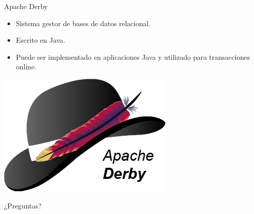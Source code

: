 \documentclass{beamer}
\begin{document}
            \begin{frame}{Apache Derby}
                \begin{minipage}{0.70\textwidth}
                    \begin{itemize}
                        \item Sistema gestor de bases de datos relacional.
                        \item Escrito en Java.
                        \item Puede ser implementado en aplicaciones Java y utilizado para transacciones online.
                    \end{itemize}
                \end{minipage}
                \begin{minipage}{0.25\textwidth}
                    \includegraphics[width=\textwidth]{res/logo-derby}
                \end{minipage}
            \end{frame}
    \begin{frame}[standout]
        ¿Preguntas?
    \end{frame}
\end{document}
